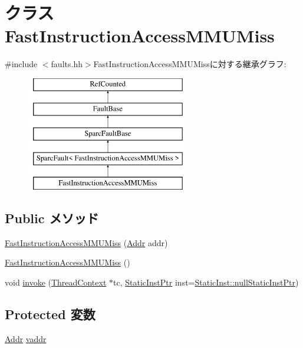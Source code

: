\hypertarget{classSparcISA_1_1FastInstructionAccessMMUMiss}{
\section{クラス FastInstructionAccessMMUMiss}
\label{classSparcISA_1_1FastInstructionAccessMMUMiss}
}


{\ttfamily \#include $<$faults.hh$>$}FastInstructionAccessMMUMissに対する継承グラフ:\begin{figure}[H]
\begin{center}
\leavevmode
\includegraphics[height=5cm]{classSparcISA_1_1FastInstructionAccessMMUMiss}
\end{center}
\end{figure}
\subsection*{Public メソッド}
\begin{DoxyCompactItemize}
\item 
\hyperlink{classSparcISA_1_1FastInstructionAccessMMUMiss_ada4d4fd9e4a23f864a1655b1dce6bd88}{FastInstructionAccessMMUMiss} (\hyperlink{base_2types_8hh_af1bb03d6a4ee096394a6749f0a169232}{Addr} addr)
\item 
\hyperlink{classSparcISA_1_1FastInstructionAccessMMUMiss_ab5fc36cab0ee04df5dbf1e5d43782c9f}{FastInstructionAccessMMUMiss} ()
\item 
void \hyperlink{classSparcISA_1_1FastInstructionAccessMMUMiss_a2bd783b42262278d41157d428e1f8d6f}{invoke} (\hyperlink{classThreadContext}{ThreadContext} $\ast$tc, \hyperlink{classRefCountingPtr}{StaticInstPtr} inst=\hyperlink{classStaticInst_aa793d9793af735f09096369fb17567b6}{StaticInst::nullStaticInstPtr})
\end{DoxyCompactItemize}
\subsection*{Protected 変数}
\begin{DoxyCompactItemize}
\item 
\hyperlink{base_2types_8hh_af1bb03d6a4ee096394a6749f0a169232}{Addr} \hyperlink{classSparcISA_1_1FastInstructionAccessMMUMiss_a9f933b300ef63eea367ca82f8da31025}{vaddr}
\end{DoxyCompactItemize}



